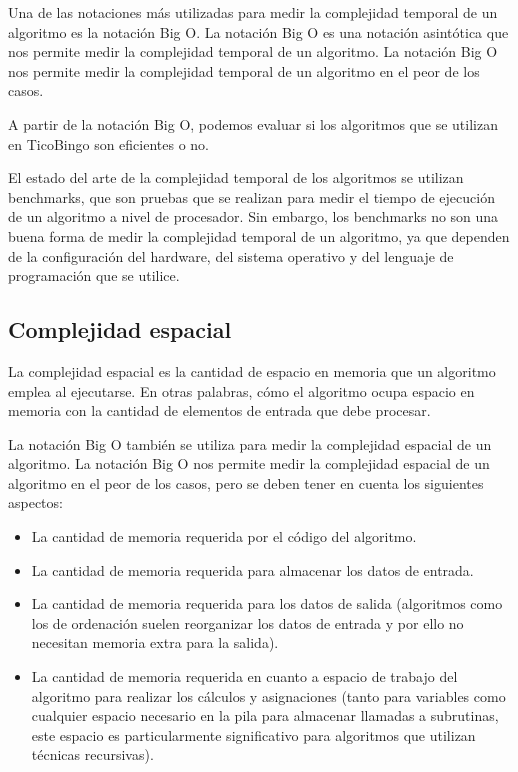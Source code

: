 \documentclass[10pt,twocolumn]{article}
\begin{document}
Una de las notaciones más utilizadas para medir la complejidad temporal de un algoritmo es la notación Big O. La notación Big O es una notación asintótica que nos permite medir la complejidad temporal de un algoritmo. La notación Big O nos permite medir la complejidad temporal de un algoritmo en el peor de los casos.

A partir de la notación Big O, podemos evaluar si los algoritmos que se utilizan en TicoBingo son eficientes o no.

El estado del arte de la complejidad temporal de los algoritmos se utilizan benchmarks, que son pruebas que se realizan para medir el tiempo de ejecución de un algoritmo a nivel de procesador. Sin embargo, los benchmarks no son una buena forma de medir la complejidad temporal de un algoritmo, ya que dependen de la configuración del hardware, del sistema operativo y del lenguaje de programación que se utilice.

\subsection{Complejidad espacial}

La complejidad espacial es la cantidad de espacio en memoria que un algoritmo emplea al ejecutarse. En otras palabras, cómo el algoritmo ocupa espacio en memoria con la cantidad de elementos de entrada que debe procesar. \cite{marcelo2021arias}

La notación Big O también se utiliza para medir la complejidad espacial de un algoritmo. La notación Big O nos permite medir la complejidad espacial de un algoritmo en el peor de los casos, pero se deben tener en cuenta los siguientes aspectos:

\begin{itemize}
\item La cantidad de memoria requerida por el código del algoritmo.
\item La cantidad de memoria requerida para almacenar los datos de entrada.
\item La cantidad de memoria requerida para los datos de salida (algoritmos como los de ordenación suelen reorganizar los datos de entrada y por ello no necesitan memoria extra para la salida).
\item La cantidad de memoria requerida en cuanto a espacio de trabajo del algoritmo para realizar los cálculos y asignaciones (tanto para variables como cualquier espacio necesario en la pila para almacenar llamadas a subrutinas, este espacio es particularmente significativo para algoritmos que utilizan técnicas recursivas).
\end{itemize} \cite{steele1977debunking}
\end{document}
